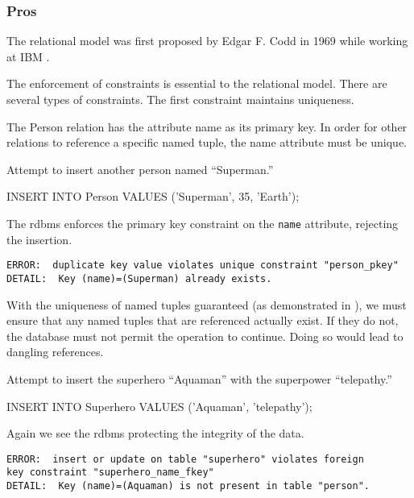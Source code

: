 		\subsubsection{Pros}
			The relational model was first proposed by Edgar F. Codd in 1969 while working at IBM \cite{codd-69}.
			
			The enforcement of constraints is essential to the relational model.  There are several types of constraints.  The first constraint maintains uniqueness.
			
			The Person relation has the attribute name as its primary key.  In order for other relations to reference a specific named tuple, the name attribute must be unique.
			
			\begin{ex}
			\label{ex:unique-constraint}
				Attempt to insert another person named ``Superman.''
				
				\begin{singlespaced}
					\begin{sqlcode}
INSERT INTO Person
VALUES      ('Superman',
             35,
             'Earth'); 
					\end{sqlcode}
				\end{singlespaced}
				
				The \gls{rdbms} enforces the primary key constraint on the \texttt{name} attribute, rejecting the insertion.
				
				\begin{verbatim}
ERROR:  duplicate key value violates unique constraint "person_pkey"
DETAIL:  Key (name)=(Superman) already exists.
				\end{verbatim}
			\end{ex}
			
			With the uniqueness of named tuples guaranteed (as demonstrated in ), we must ensure that any named tuples that are referenced actually exist.  If they do not, the database must not permit the operation to continue.  Doing so would lead to dangling references.
			
			\begin{ex}
				Attempt to insert the superhero ``Aquaman'' with the superpower ``telepathy.''
				
				\begin{singlespaced}
					\begin{sqlcode}
INSERT INTO Superhero
VALUES      ('Aquaman',
             'telepathy'); 
					\end{sqlcode}
				\end{singlespaced}
				
				Again we see the \gls{rdbms} protecting the integrity of the data.
				
				\begin{verbatim}
ERROR:  insert or update on table "superhero" violates foreign
key constraint "superhero_name_fkey"
DETAIL:  Key (name)=(Aquaman) is not present in table "person".
				\end{verbatim}
			\end{ex}
			
